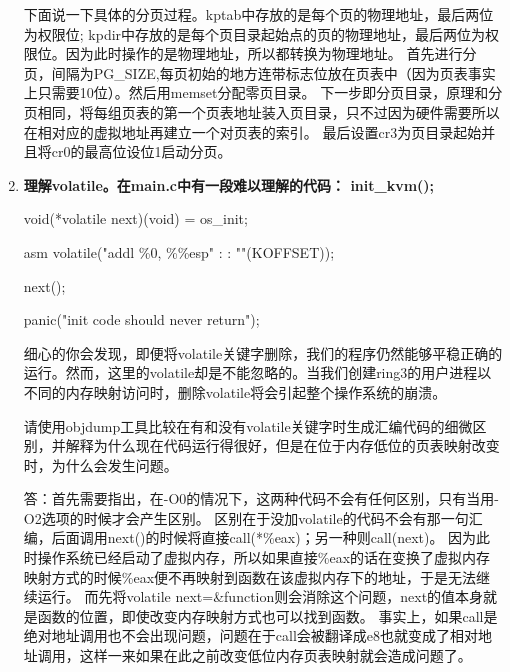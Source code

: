 \documentclass[11pt]{article}
\begin{document}
\begin{enumerate}
下面说一下具体的分页过程。kptab中存放的是每个页的物理地址，最后两位为权限位; kpdir中存放的是每个页目录起始点的页的物理地址，最后两位为权限位。因为此时操作的是物理地址，所以都转换为物理地址。
首先进行分页，间隔为PG\_SIZE,每页初始的地方连带标志位放在页表中（因为页表事实上只需要10位）。然后用memset分配零页目录。
下一步即分页目录，原理和分页相同，将每组页表的第一个页表地址装入页目录，只不过因为硬件需要所以在相对应的虚拟地址再建立一个对页表的索引。
最后设置cr3为页目录起始并且将cr0的最高位设位1启动分页。


\item  \bf
理解volatile。在main.c中有一段难以理解的代码：
init\_kvm();

void(*volatile next)(void) = os\_init;

asm volatile("addl \%0, \%\%esp" : : ""(KOFFSET));

next();

panic("init code should never return");

细心的你会发现，即便将volatile关键字删除，我们的程序仍然能够平稳正确的运行。然而，这里的volatile却是不能忽略的。当我们创建ring3的用户进程以不同的内存映射访问时，删除volatile将会引起整个操作系统的崩溃。

请使用objdump工具比较在有和没有volatile关键字时生成汇编代码的细微区别，并解释为什么现在代码运行得很好，但是在位于内存低位的页表映射改变时，为什么会发生问题。\rm

答：首先需要指出，在-O0的情况下，这两种代码不会有任何区别，只有当用-O2选项的时候才会产生区别。
区别在于没加volatile的代码不会有那一句汇编，后面调用next()的时候将直接call(*\%eax)；另一种则call(next)。
因为此时操作系统已经启动了虚拟内存，所以如果直接\%eax的话在变换了虚拟内存映射方式的时候\%eax便不再映射到函数在该虚拟内存下的地址，于是无法继续运行。
而先将volatile next=\&function则会消除这个问题，next的值本身就是函数的位置，即使改变内存映射方式也可以找到函数。
事实上，如果call是绝对地址调用也不会出现问题，问题在于call会被翻译成e8也就变成了相对地址调用，这样一来如果在此之前改变低位内存页表映射就会造成问题了。
\end{enumerate}    
\end{document}
